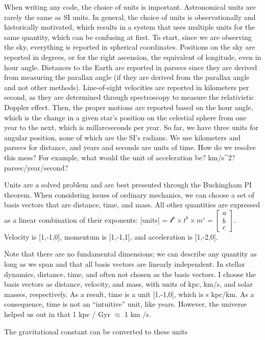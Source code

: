     When writing any code, the choice of units is important. Astronomical units are rarely the same as SI units. In general, the choice of units is observationally and historically motivated, which results in a system that uses multiple units for the same quantity, which can be confusing at first. To start, since we are observing the sky, everything is reported in spherical coordinates. Positions on the sky are reported in degrees, or for the right ascension, the equivalent of longitude, even in hour angle. Distances to the Earth are reported in parsecs since they are derived from measuring the parallax angle (if they are derived from the parallax angle and not other methods). Line-of-sight velocities are reported in kilometers per second, as they are determined through spectroscopy to measure the relativistic Doppler effect. Then, the proper motions are reported based on the hour angle, which is the change in a given star's position on the celestial sphere from one year to the next, which is millarcseconds per year. So far, we have three units for angular position, none of which are the SI's radians. We use kilometers and parsecs for distance, and years and seconds are units of time. How do we resolve this mess?  For example, what would the unit of acceleration be? km/s^2? parsec/year/second?

    Units are a solved problem and are best presented through the Buckingham PI theorem. When considering issues of ordinary mechanics, we can choose a set of basis vectors that are distance, time, and mass. All other quantities are expressed as a linear combination of their exponents: [units] = $\mathcal{l}^a\times t^b\times m^c = \begin{bmatrix} a\\b\\c \end{bmatrix}$. Velocity is [1,-1,0], momentum is [1,-1,1], and acceleration is [1,-2,0]. 

    Note that there are no fundamental dimensions; we can describe any quantity as long as we span and that all basis vectors are linearly independent. In stellar dynamics, distance, time, and often not chosen as the basis vectors. I choose the basis vectors as distance, velocity, and mass, with units of kpc, km/s, and solar masses, respectively. As a result, time is a unit [1,-1,0], which is s kpc/km. As a consequence, time is not an ``intuitive'' unit, like years. However, the universe helped us out in that 1 kpc / Gyr $\approx$ 1 km /s. 

    The gravitational constant can be converted to these units 

